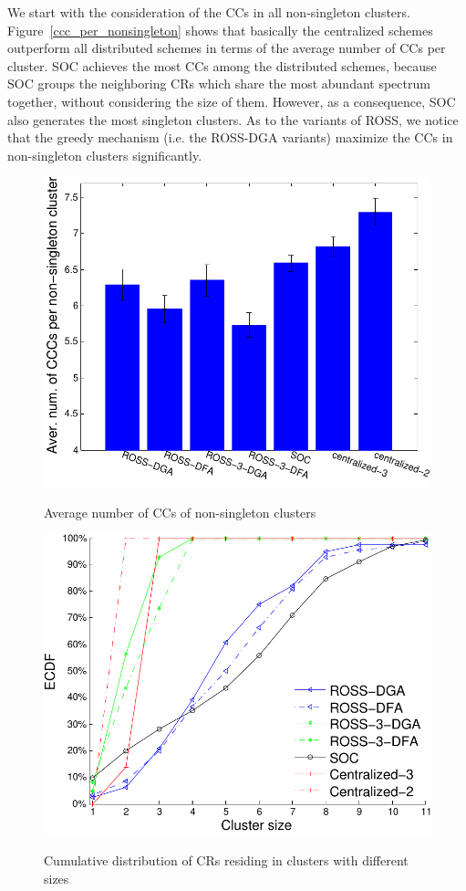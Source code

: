 \documentclass[times]{ettauth}
\theoremstyle{mytheoremstyle}
\theoremstyle{mytheoremstyle}
\theoremstyle{mytheoremstyle}
\begin{document}
We start with the consideration of the CCs in all non-singleton clusters.
Figure~\ref{ccc_per_nonsingleton} shows that basically the centralized schemes outperform all distributed schemes in terms of the average number of CCs per cluster.
SOC achieves the most CCs among the distributed schemes, because SOC groups the neighboring CRs which share the most abundant spectrum together, without considering the size of them.
However, as a consequence, SOC also generates the most singleton clusters.
As to the variants of ROSS, we notice that the greedy mechanism (i.e. the ROSS-DGA variants) maximize the CCs in non-singleton clusters significantly.
\begin{figure}[th]
\begin{multicols}{3}
    \includegraphics[width=\linewidth]{ccc_20.pdf}\par\caption{Average number of CCs of non-singleton clusters}\label{ccc_per_nonsingleton}
    \includegraphics[width=\linewidth]{cdf_clusterSize_20.pdf}\par\caption{Cumulative distribution of CRs residing in clusters with different sizes}\label{size_control}    

\end{multicols}
\end{figure}
\end{document}
